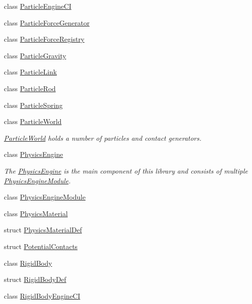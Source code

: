 \begin{DoxyCompactItemize}
\item 
class \mbox{\hyperlink{classr3_1_1_particle_engine_c_i}{Particle\+Engine\+CI}}
\item 
class \mbox{\hyperlink{classr3_1_1_particle_force_generator}{Particle\+Force\+Generator}}
\item 
class \mbox{\hyperlink{classr3_1_1_particle_force_registry}{Particle\+Force\+Registry}}
\item 
class \mbox{\hyperlink{classr3_1_1_particle_gravity}{Particle\+Gravity}}
\item 
class \mbox{\hyperlink{classr3_1_1_particle_link}{Particle\+Link}}
\item 
class \mbox{\hyperlink{classr3_1_1_particle_rod}{Particle\+Rod}}
\item 
class \mbox{\hyperlink{classr3_1_1_particle_spring}{Particle\+Spring}}
\item 
class \mbox{\hyperlink{classr3_1_1_particle_world}{Particle\+World}}
\begin{DoxyCompactList}\small\item\em \mbox{\hyperlink{classr3_1_1_particle_world}{Particle\+World}} holds a number of particles and contact generators. \end{DoxyCompactList}\item 
class \mbox{\hyperlink{classr3_1_1_physics_engine}{Physics\+Engine}}
\begin{DoxyCompactList}\small\item\em The \mbox{\hyperlink{classr3_1_1_physics_engine}{Physics\+Engine}} is the main component of this library and consists of multiple \mbox{\hyperlink{classr3_1_1_physics_engine_module}{Physics\+Engine\+Module}}. \end{DoxyCompactList}\item 
class \mbox{\hyperlink{classr3_1_1_physics_engine_module}{Physics\+Engine\+Module}}
\item 
class \mbox{\hyperlink{classr3_1_1_physics_material}{Physics\+Material}}
\item 
struct \mbox{\hyperlink{structr3_1_1_physics_material_def}{Physics\+Material\+Def}}
\item 
struct \mbox{\hyperlink{structr3_1_1_potential_contacts}{Potential\+Contacts}}
\item 
class \mbox{\hyperlink{classr3_1_1_rigid_body}{Rigid\+Body}}
\item 
struct \mbox{\hyperlink{structr3_1_1_rigid_body_def}{Rigid\+Body\+Def}}
\item 
class \mbox{\hyperlink{classr3_1_1_rigid_body_engine_c_i}{Rigid\+Body\+Engine\+CI}}

\end{DoxyCompactItemize}
